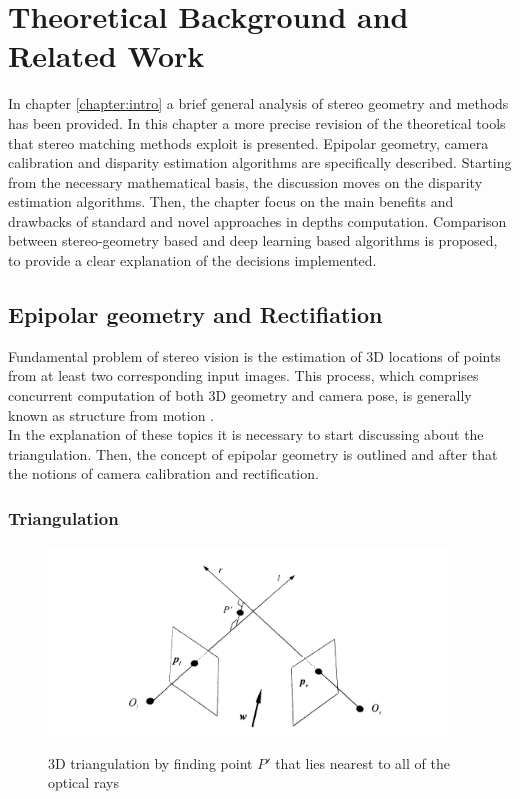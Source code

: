 \chapter{Theoretical Background and Related Work}
\label{chapter:background} 

In chapter \ref{chapter:intro} a brief general analysis of stereo geometry and methods has been provided. 
In this chapter a more precise revision of the theoretical tools that stereo matching methods exploit is presented.
Epipolar geometry, camera calibration and disparity estimation algorithms are specifically described. 
Starting from the necessary mathematical basis, the discussion moves on the disparity estimation algorithms. 
Then, the chapter focus on the main benefits and drawbacks of standard and novel approaches in depths computation.
Comparison between stereo-geometry based and deep learning based algorithms is proposed, to provide a clear explanation of the decisions implemented. 

\section{Epipolar geometry and Rectifiation}
\label{sec:eipolarandrect}

Fundamental problem of stereo vision is the estimation of 3D locations of points from at least two corresponding input images.
This process, which comprises concurrent computation of both 3D geometry and camera pose, is generally known as structure from motion \cite{Szeliski2011}.\\
In the explanation of these topics it is necessary to start discussing about the triangulation.
Then, the concept of epipolar geometry is outlined and after that the notions of camera calibration and rectification. 

\subsection{Triangulation}
\label{subsec:triangulation}

\begin{figure}[t]
	\begin{center}
		{\includegraphics[width=.8\textwidth, height=5cm, keepaspectratio]{images/triangulation}}
\caption{3D triangulation by finding point $P'$ that lies nearest to all of the optical rays}
\label{fig:triangulation}
	\end{center}
\end{figure}

